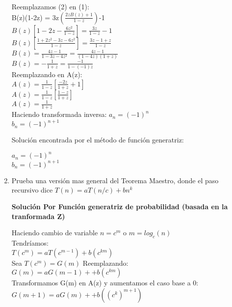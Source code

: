 \documentclass{article}
\begin{document}
\begin{enumerate}[label=\textbf{\alph*.}]
  Reemplazamos (2) en (1):\\
  B(z)(1-2z) = 3z$(\frac{2zB(z)+1}{1-z})$-1\\
  $B(z)[1-2z-\frac{6z^2}{1-z}] = \frac{3z}{1-z}-1$\\
  $B(z)[\frac{1+2z^2-3z-6z^2}{1-z}]=\frac{3z-1+z}{1-z}$\\
  $B(z) = \frac{4z-1}{1-3z-4z^2} = \frac{4z-1}{(1-4z)(1+z)}$\\
  $B(z)=-\frac{1}{1+z}=\frac{-1}{1-(-1)z}$\\
  
  Reemplazando en A(z):\\
  $A(z) = \frac{1}{1-z}[\frac{-2z}{1+z}+1]$\\
  $A(z) =\frac{1}{1-z}[\frac{1-z}{1+z}]$\\
  $A(z) =\frac{1}{1+z}$\\
  Haciendo transformada inversa:
  $a_n = (-1)^n$\\
  $b_n = (-1)^{n+1}$
  
  Soluci\'on encontrada por el m\'etodo de función generatriz:
  \begin{center}
    $a_n = (-1)^n$\\
    $b_n = (-1)^{n+1}$
  \end{center}
  

  \item Prueba una versión mas general del Teorema Maestro, donde el paso recursivo dice $T(n)=aT(n/c)+bn^k$

    \textbf{Soluci\'on Por Funci\'on generatriz de probabilidad (basada en la tranformada Z)}
  
    Haciendo cambio de variable $n=c^m$ o $m=log_c(n)$\\
  Tendríamos:\\
  $T(c^m)=aT(c^{m-1})+b(c^{km})$\\
  Sea $T(c^m) = G(m)$%
  Reemplazando:\\
  $G(m)=aG(m-1)++b(c^{km})$\\
  Transformamos G(m) en A(z) y aumentamos el caso base a 0:\\
  $G(m+1)=aG(m)++b((c^k)^{m+1})$\\
  

\end{enumerate}
\end{document}

